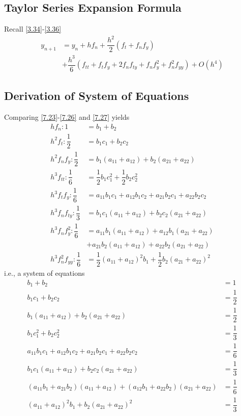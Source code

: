 \documentclass[a4paper,oneside]{book}
\numberwithin{equation}{chapter}
\begin{document}
\subsection{Taylor Series Expansion Formula}
Recall \eqref{3.34}-\eqref{3.36}
\begin{align}
\label{7.27}
{{y_{n + 1}}} &= {{y_n}} + h{f_n} + \dfrac{{{h^2}}}{2}\left( {{f_t} + {f_n}{f_y}} \right) \\
&+ \dfrac{{{h^3}}}{6}\left( {{f_{tt}} + {f_t}{f_y} + 2{f_n}{f_{ty}} + {f_n}f_y^2 + f_n^2{f_{yy}}} \right) + O\left( {{h^4}} \right)
\end{align}
\subsection{Derivation of System of Equations}
Comparing \eqref{7.23}-\eqref{7.26} and \eqref{7.27} yields
\begin{align}
h{f_n}:1 &= {b_1} + {b_2}\\
{h^2}{f_t}:\dfrac{1}{2} &= {b_1}{c_1} + {b_2}{c_2}\\
{h^2}{f_n}{f_y}:\dfrac{1}{2} &= {b_1}\left( {{a_{11}} + {a_{12}}} \right) + {b_2}\left( {{a_{21}} + {a_{22}}} \right)\\
{h^3}{f_{tt}}:\dfrac{1}{6} &= \dfrac{1}{2}{b_1}c_1^2 + \dfrac{1}{2}{b_2}c_2^2\\
{h^3}{f_t}{f_y}:\dfrac{1}{6} &= {a_{11}}{b_1}{c_1} + {a_{12}}{b_1}{c_2} + {a_{21}}{b_2}{c_1} + {a_{22}}{b_2}{c_2}\\
{h^3}{f_n}{f_{ty}}:\dfrac{1}{3} &= {b_1}{c_1}\left( {{a_{11}} + {a_{12}}} \right) + {b_2}{c_2}\left( {{a_{21}} + {a_{22}}} \right)\\
{h^3}{f_n}f_y^2:\dfrac{1}{6} &= {a_{11}}{b_1}\left( {{a_{11}} + {a_{12}}} \right) + {a_{12}}{b_1}\left( {{a_{21}} + {a_{22}}} \right)\\
& + {a_{21}}{b_2}\left( {{a_{11}} + {a_{12}}} \right) + {a_{22}}{b_2}\left( {{a_{21}} + {a_{22}}} \right)\\
{h^3}f_n^2{f_{yy}}:\dfrac{1}{6} &= \dfrac{1}{2}{\left( {{a_{11}} + {a_{12}}} \right)^2}{b_1} + \dfrac{1}{2}{b_2}{\left( {{a_{21}} + {a_{22}}} \right)^2}
\end{align}
i.e., a system of equations
\begin{align}
{b_1} + {b_2} &= 1\\
{b_1}{c_1} + {b_2}{c_2} &= \dfrac{1}{2}\\
{b_1}\left( {{a_{11}} + {a_{12}}} \right) + {b_2}\left( {{a_{21}} + {a_{22}}} \right) &= \dfrac{1}{2}\\
{b_1}c_1^2 + {b_2}c_2^2 &= \dfrac{1}{3}\\
{a_{11}}{b_1}{c_1} + {a_{12}}{b_1}{c_2} + {a_{21}}{b_2}{c_1} + {a_{22}}{b_2}{c_2} &= \dfrac{1}{6}\\
{b_1}{c_1}\left( {{a_{11}} + {a_{12}}} \right) + {b_2}{c_2}\left( {{a_{21}} + {a_{22}}} \right) &= \dfrac{1}{3}\\
\left( {{a_{11}}{b_1} + {a_{21}}{b_2}} \right)\left( {{a_{11}} + {a_{12}}} \right) + \left( {{a_{12}}{b_1} + {a_{22}}{b_2}} \right)\left( {{a_{21}} + {a_{22}}} \right) &= \dfrac{1}{6}\\
{\left( {{a_{11}} + {a_{12}}} \right)^2}{b_1} + {b_2}{\left( {{a_{21}} + {a_{22}}} \right)^2} &= \dfrac{1}{3}
\end{align}
\end{document}
